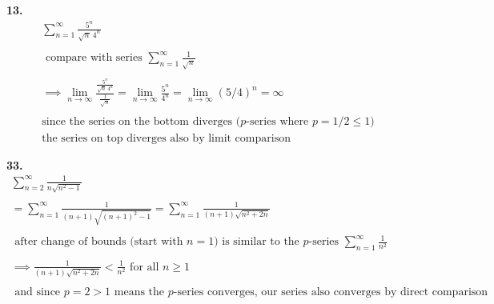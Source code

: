 \documentclass{article}
\begin{document}
\noindent
\textbf{
13.
}
\\
\begin{gather*}
\sum_{n=1}^{\infty} \frac{5^n}{\sqrt{n}~4^n}
\\
\\
\text{ compare with series }
\sum_{n=1}^{\infty} \frac{1}{\sqrt{n}}
\\
\\
\implies
\lim_{n \to \infty} \frac{\frac{5^n}{\sqrt{n}~4^n}}{\frac{1}{\sqrt{n}}}
= \lim_{n \to \infty} \frac{5^n}{4^n}= \lim_{n \to \infty}(5/4)^n=\infty
\\
\\
\text{since the series on the bottom diverges ($p$-series where $p=1/2\leq1$)}
\\
\text{the series on top diverges also by limit comparison}
\end{gather*}


\noindent
\textbf{
33.
}
\\
\begin{gather*}
\sum_{n=2}^{\infty} \frac{1}{n\sqrt{n^2-1}}
\\
\\
=\sum_{n=1}^{\infty} \frac{1}{(n+1)\sqrt{(n+1)^2-1}}
=\sum_{n=1}^{\infty} \frac{1}{(n+1)\sqrt{n^2+2n}}
\\
\\
\text{ after change of bounds (start with $n=1$) is similar to the $p$-series }
\sum_{n=1}^{\infty} \frac{1}{n^2}
\\
\\
\implies
\frac{1}{(n+1)\sqrt{n^2+2n}}<\frac{1}{n^2}
\text{ for all } n \geq 1
\\
\\
\text{ and since $p=2>1$ means the $p$-series converges, our series also converges
by direct comparison}
\end{gather*}
\end{document}
